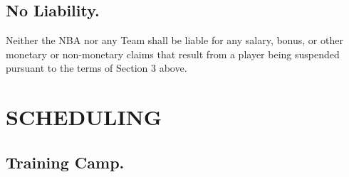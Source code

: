 \documentclass[
]{book}
\begin{document}
\hypertarget{no-liability.}{%
\section{No Liability.}\label{no-liability.}}

Neither the NBA nor any Team shall be liable for any salary, bonus, or other monetary or non-monetary claims that result from a player being suspended pursuant to the terms of Section 3 above.

\hypertarget{scheduling}{%
\chapter{SCHEDULING}\label{scheduling}}

\hypertarget{training-camp.}{%
\section{Training Camp.}\label{training-camp.}}
\end{document}
